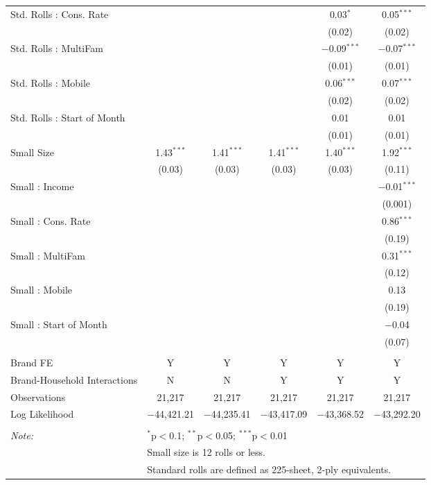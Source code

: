 \begin{table}[!htbp]
\begin{tabular}{@{\extracolsep{5pt}}lccccc}
  Std. Rolls : Cons. Rate &  &  &  & 0.03$^{*}$ & 0.05$^{***}$ \\ 
  &  &  &  & (0.02) & (0.02) \\ 
  Std. Rolls : MultiFam &  &  &  & $-$0.09$^{***}$ & $-$0.07$^{***}$ \\ 
  &  &  &  & (0.01) & (0.01) \\ 
  Std. Rolls : Mobile &  &  &  & 0.06$^{***}$ & 0.07$^{***}$ \\ 
  &  &  &  & (0.02) & (0.02) \\ 
  Std. Rolls : Start of Month &  &  &  & 0.01 & 0.01 \\ 
  &  &  &  & (0.01) & (0.01) \\ 
  Small Size & 1.43$^{***}$ & 1.41$^{***}$ & 1.41$^{***}$ & 1.40$^{***}$ & 1.92$^{***}$ \\ 
  & (0.03) & (0.03) & (0.03) & (0.03) & (0.11) \\ 
  Small : Income &  &  &  &  & $-$0.01$^{***}$ \\ 
  &  &  &  &  & (0.001) \\ 
  Small : Cons. Rate &  &  &  &  & 0.86$^{***}$ \\ 
  &  &  &  &  & (0.19) \\ 
  Small : MultiFam &  &  &  &  & 0.31$^{***}$ \\ 
  &  &  &  &  & (0.12) \\ 
  Small : Mobile &  &  &  &  & 0.13 \\ 
  &  &  &  &  & (0.19) \\ 
  Small : Start of Month &  &  &  &  & $-$0.04 \\ 
  &  &  &  &  & (0.07) \\ 
 \hline \\[-1.8ex] 
Brand FE & Y & Y & Y & Y & Y \\ 
Brand-Household Interactions & N & N & Y & Y & Y \\ 
Observations & 21,217 & 21,217 & 21,217 & 21,217 & 21,217 \\ 
Log Likelihood & $-$44,421.21 & $-$44,235.41 & $-$43,417.09 & $-$43,368.52 & $-$43,292.20 \\ 
\hline 
\hline \\[-1.8ex] 
\textit{Note:}  & \multicolumn{5}{l}{$^{*}$p$<$0.1; $^{**}$p$<$0.05; $^{***}$p$<$0.01} \\ 
 & \multicolumn{5}{l}{Small size is 12 rolls or less.} \\ 
 & \multicolumn{5}{l}{Standard rolls are defined as 225-sheet, 2-ply equivalents.} \\ 
\end{tabular} 
\end{table} 
